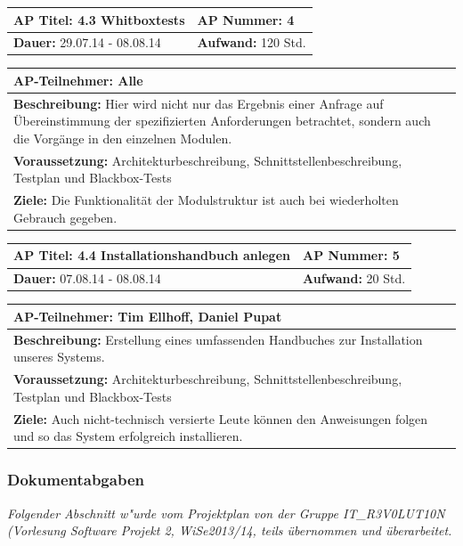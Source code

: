 \documentclass[fontsize=12pt,paper=a4,twoside]{scrartcl}
\begin{document}
\begin{tabular}{|p{7.43cm}|p{7.43cm}|}
\hline
\textbf{AP Titel: }4.3 Whitboxtests & \textbf{AP Nummer: }4\\ 
\hline
\textbf{Dauer: }29.07.14 - 08.08.14& \textbf{Aufwand: } 120 Std.\\
\hline
\end{tabular}
\begin{tabular}{|p{15.3cm}|}
\hline
\textbf{AP-Teilnehmer: }Alle\\
\hline
\textbf{Beschreibung: }Hier wird nicht nur das Ergebnis einer Anfrage auf Übereinstimmung der spezifizierten Anforderungen betrachtet, sondern auch die Vorgänge 
in den einzelnen Modulen.\\
\hline
\textbf{Voraussetzung: }Architekturbeschreibung, Schnittstellenbeschreibung, Testplan und Blackbox-Tests \\
\hline 
\textbf{Ziele: }Die Funktionalität der Modulstruktur ist auch bei wiederholten Gebrauch gegeben.\\
\hline 
\end{tabular}

\begin{tabular}{|p{7.43cm}|p{7.43cm}|}
\hline
\textbf{AP Titel: }4.4 Installationshandbuch anlegen & \textbf{AP Nummer: }5\\ 
\hline
\textbf{Dauer: }07.08.14 - 08.08.14& \textbf{Aufwand: } 20 Std.\\
\hline
\end{tabular}
\begin{tabular}{|p{15.3cm}|}
\hline
\textbf{AP-Teilnehmer: }Tim Ellhoff, Daniel Pupat\\
\hline
\textbf{Beschreibung: }Erstellung eines umfassenden Handbuches zur Installation unseres Systems.\\
\hline
\textbf{Voraussetzung: }Architekturbeschreibung, Schnittstellenbeschreibung, Testplan und Blackbox-Tests \\
\hline 
\textbf{Ziele: }Auch nicht-technisch versierte Leute können den Anweisungen folgen und so das System erfolgreich installieren.\\
\hline 
\end{tabular}

\subsubsection{Dokumentabgaben}\label{aps}

\textit{Folgender Abschnitt w"urde vom Projektplan von der Gruppe IT\_R3V0LUT10N (Vorlesung Software Projekt 2, WiSe2013/14, teils übernommen und überarbeitet.}
\end{document}
